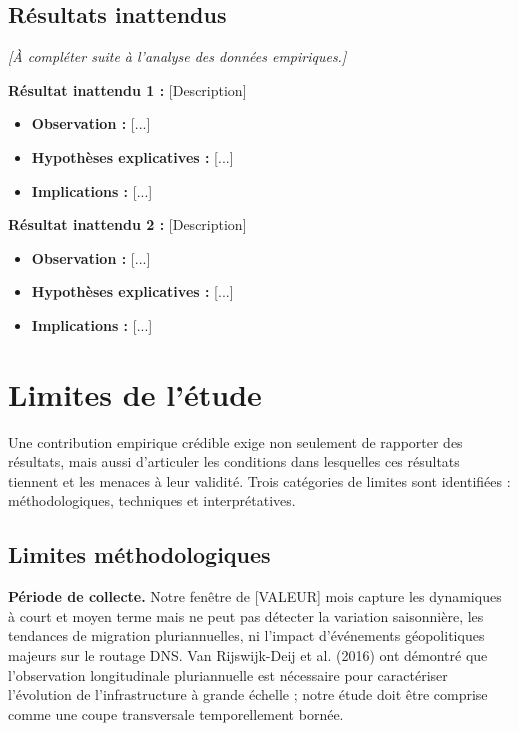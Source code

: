 \subsection{Résultats inattendus}
\label{subsec:5.1.5}

\textit{[À compléter suite à l'analyse des données empiriques.]}

\textbf{Résultat inattendu 1 :} [Description]
\begin{itemize}
  \item \textbf{Observation :} [...]
  \item \textbf{Hypothèses explicatives :} [...]
  \item \textbf{Implications :} [...]
\end{itemize}

\textbf{Résultat inattendu 2 :} [Description]
\begin{itemize}
  \item \textbf{Observation :} [...]
  \item \textbf{Hypothèses explicatives :} [...]
  \item \textbf{Implications :} [...]
\end{itemize}

\bigskip
\section{Limites de l'étude}
\label{sec:5.2}

Une contribution empirique crédible exige non seulement de rapporter des résultats, mais aussi d'articuler les conditions dans lesquelles ces résultats tiennent et les menaces à leur validité. Trois catégories de limites sont identifiées : méthodologiques, techniques et interprétatives.
\bigskip
\subsection{Limites méthodologiques}
\label{subsec:5.2.1}

\textbf{Période de collecte.}
Notre fenêtre de [VALEUR] mois capture les dynamiques à court et moyen terme mais ne peut pas détecter la variation saisonnière, les tendances de migration pluriannuelles, ni l'impact d'événements géopolitiques majeurs sur le routage DNS. Van Rijswijk-Deij et al. (2016) ont démontré que l'observation longitudinale pluriannuelle est nécessaire pour caractériser l'évolution de l'infrastructure à grande échelle ; notre étude doit être comprise comme une coupe transversale temporellement bornée.

